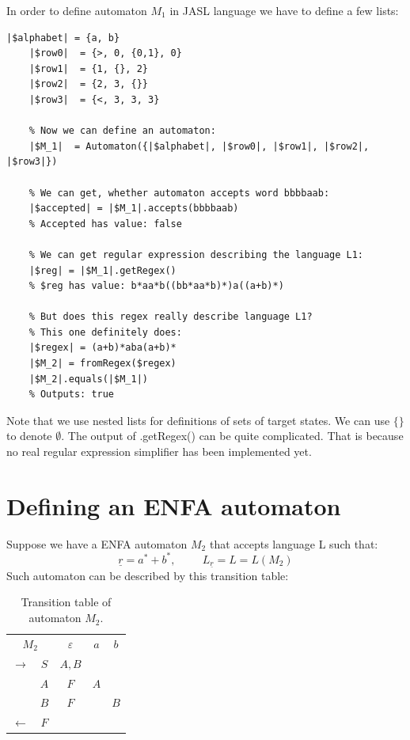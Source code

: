 \documentclass{ctuthesis}
\begin{document}
In order to define automaton $M_1$ in JASL language we have to define a few lists: 

\begin{minipage}{\linewidth}
\begin{lstlisting}[language = JASL]
	|$alphabet| = {a, b}
	|$row0|  = {>, 0, {0,1}, 0}
	|$row1|  = {1, {}, 2}
	|$row2|  = {2, 3, {}}
	|$row3|  = {<, 3, 3, 3}
    
	% Now we can define an automaton:
	|$M_1|  = Automaton({|$alphabet|, |$row0|, |$row1|, |$row2|, |$row3|})

	% We can get, whether automaton accepts word bbbbaab:
	|$accepted| = |$M_1|.accepts(bbbbaab)   
	% Accepted has value: false 
	
	% We can get regular expression describing the language L1:
	|$reg| = |$M_1|.getRegex()
	% $reg has value: b*aa*b((bb*aa*b)*)a((a+b)*) 

	% But does this regex really describe language L1? 
	% This one definitely does:
	|$regex| = (a+b)*aba(a+b)*
	|$M_2| = fromRegex($regex)
	|$M_2|.equals(|$M_1|) 	
	% Outputs: true
\end{lstlisting}
\end{minipage}

Note that we use nested lists for definitions of sets of target states. We can use $\{\}$ to denote $\emptyset$. The output of .getRegex() can be quite complicated. That is because no real regular expression simplifier has been implemented yet.

\section{Defining an ENFA automaton}
\label{sec:example_ENFA}
Suppose we have a ENFA automaton $M_2$ that accepts language L such that:
\begin{equation*}
	\underline{r} = a^*+b^*, \hspace{1cm} L_{\underline{r}} = L = L(M_2) 
\end{equation*}
Such automaton can be described by this transition table:
\begin{table}[H]
\begin{ctucolortab}
\begin{tabular}{cc|ccc}
\multicolumn{2}{c}{$M_2$} & $\varepsilon$ & $a$ & $b$ \\\Midrule
$\rightarrow$ 	& $S$ & $A,B$  \\
				& $A$ & $F$ 	& $A$  \\
				& $B$ & $F$		& & $B$ \\
$\leftarrow$	& $F$ & 		&  
\end{tabular}
\end{ctucolortab}
\caption{Transition table of automaton $M_2$.}
\label{fig:examples_DFA_table}
\end{table} 
\end{document}

